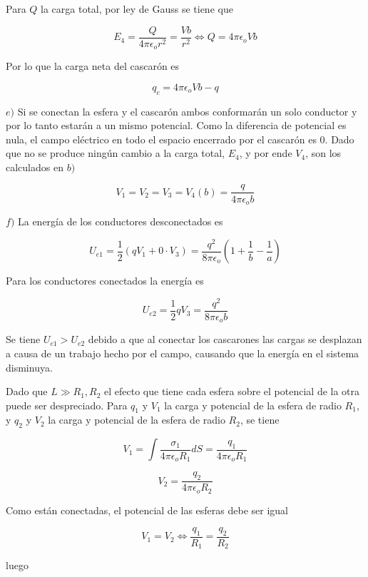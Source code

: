 Para $Q$ la carga total, por ley de Gauss se tiene que

\[E_4= \frac{Q}{4\pi\epsilon_o r^2} = \frac{Vb}{r^2}
\Leftrightarrow Q = 4\pi\epsilon_o Vb\]

Por lo que la carga neta del cascarón es

\[q_c = 4\pi\epsilon_o Vb - q\]

\bigbreak

$e)$ Si se conectan la esfera y el cascarón ambos conformarán un solo conductor y por lo tanto estarán a un mismo potencial. Como la diferencia de potencial es nula, el campo eléctrico en todo el espacio encerrado por el cascarón es 0. Dado que no se produce ningún cambio a la carga total, $E_4$, y por ende $V_4$, son los calculados en $b)$

\[V_1=V_2=V_3=V_4(b)=\frac{q}{4\pi\epsilon_o b}\]
\bigbreak

$f)$ La energía de los conductores desconectados es

\[U_{e1} = \frac{1}{2}(qV_1 + 0\cdot V_3) = \frac{q^2}{8\pi\epsilon_o}
\left(1+\frac{1}{b}-\frac{1}{a}\right)\]

Para los conductores conectados la energía es

\[U_{e2} = \frac{1}{2}qV_3 = \frac{q^2}{8\pi\epsilon_o b}\]

Se tiene $U_{e1} > U_{e2}$ debido a que al conectar los cascarones las cargas se desplazan a causa de un trabajo hecho por el campo, causando que la energía en el sistema disminuya.%

\bigbreak
\bigbreak

\newline\newline
Dado que $L \gg R_1, R_2$ el efecto que tiene cada esfera sobre el potencial de la otra puede ser despreciado. Para $q_1$ y $V_1$ la carga y potencial de la esfera de radio $R_1$, y $q_2$ y $V_2$ la carga y potencial de la esfera de radio $R_2$, se tiene

\[V_1 = \int\frac{\sigma_1}{4\pi\epsilon_o R_1}dS = 
\frac{q_1}{4\pi\epsilon_o R_1}\]

\[V_2 = \frac{q_2}{4\pi\epsilon_o R_2}\]

Como están conectadas, el potencial de las esferas debe ser igual

\[V_1 = V_2 \Leftrightarrow \frac{q_1}{R_1} = \frac{q_2}{R_2}\]

luego

